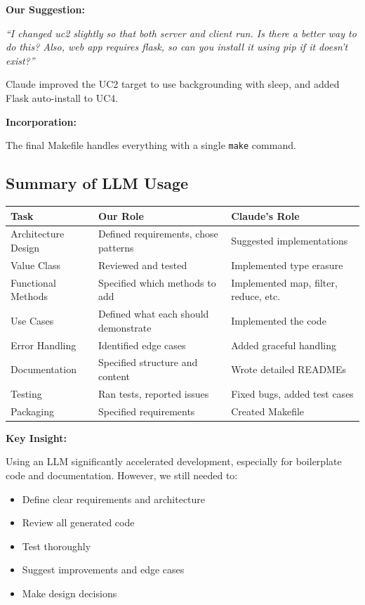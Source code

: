 \documentclass[11pt,a4paper]{article}
\begin{document}
\textbf{Our Suggestion:}

\textit{``I changed uc2 slightly so that both server and client run. Is there a better way to do this? Also, web app requires flask, so can you install it using pip if it doesn't exist?''}

Claude improved the UC2 target to use backgrounding with sleep, and added Flask auto-install to UC4.

\textbf{Incorporation:}

The final Makefile handles everything with a single \texttt{make} command.

\subsection{Summary of LLM Usage}

\begin{center}
\small
\begin{longtable}{|l|p{5cm}|p{5cm}|}
\hline
\textbf{Task} & \textbf{Our Role} & \textbf{Claude's Role} \\
\hline
Architecture Design & Defined requirements, chose patterns & Suggested implementations \\
Value Class & Reviewed and tested & Implemented type erasure \\
Functional Methods & Specified which methods to add & Implemented map, filter, reduce, etc. \\
Use Cases & Defined what each should demonstrate & Implemented the code \\
Error Handling & Identified edge cases & Added graceful handling \\
Documentation & Specified structure and content & Wrote detailed READMEs \\
Testing & Ran tests, reported issues & Fixed bugs, added test cases \\
Packaging & Specified requirements & Created Makefile \\
\hline
\end{longtable}
\end{center}

\textbf{Key Insight:}

Using an LLM significantly accelerated development, especially for boilerplate code and documentation. However, we still needed to:
\begin{itemize}
    \item Define clear requirements and architecture
    \item Review all generated code
    \item Test thoroughly
    \item Suggest improvements and edge cases
    \item Make design decisions
\end{itemize}
\end{document}
